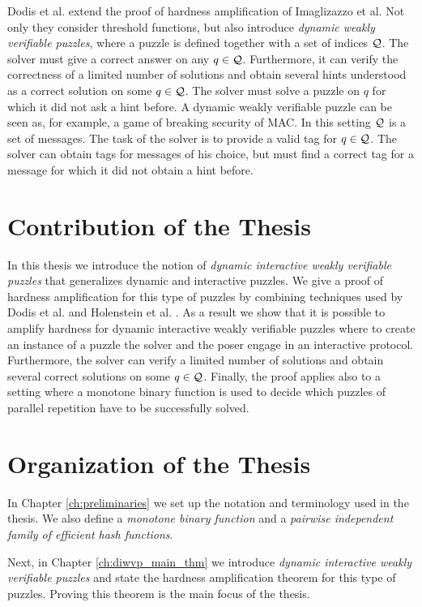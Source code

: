 Dodis et al. \cite{dodis2009security} extend the proof of hardness amplification of Imaglizazzo et al.
Not only they consider threshold functions, but also introduce \textit{dynamic weakly verifiable puzzles}, where a puzzle is defined together with a set of indices $\mathcal{Q}$.
The solver must give a correct answer on any $q \in \mathcal{Q}$. Furthermore, it can verify the correctness of a limited number of solutions and
obtain several hints understood as a correct solution on some $q \in \mathcal{Q}$. The solver must solve a puzzle on $q$ for which it did not ask a hint before.
A dynamic weakly verifiable puzzle can be seen as, for example, a game of breaking security of MAC.
In this setting $\mathcal{Q}$ is a set of messages. The task of the solver is to provide a valid tag for $q \in \mathcal{Q}$.
The solver can obtain tags for messages of his choice, but must find a correct tag for a message for which it did not obtain a hint before.

\section{Contribution of the Thesis}
In this thesis we introduce the notion of \textit{dynamic interactive weakly verifiable puzzles} that generalizes dynamic and interactive puzzles.
We give a proof of hardness amplification for this type of puzzles by combining techniques
used by Dodis et al. \cite{dodis2009security} and Holenstein et al. \cite{holenstein2011general}.
As a result we show that it is possible to amplify hardness for dynamic interactive weakly verifiable puzzles where
to create an instance of a puzzle the solver and the poser engage in an interactive protocol.
Furthermore, the solver can verify a limited number of solutions and obtain several correct solutions on some $q \in \mathcal{Q}$.
Finally, the proof applies also to a setting where a monotone binary function is used to decide which puzzles of parallel repetition
have to be successfully solved.
%
\section{Organization of the Thesis}
In Chapter \ref{ch:preliminaries} we set up the notation and terminology used in the thesis.
We also define a \textit{monotone binary function} and a \textit{pairwise independent family of efficient hash functions}.

Next, in Chapter \ref{ch:diwvp_main_thm} we introduce \textit{dynamic interactive weakly verifiable
puzzles} and state the hardness amplification theorem for this type of puzzles.
Proving this theorem is the main focus of the thesis.

